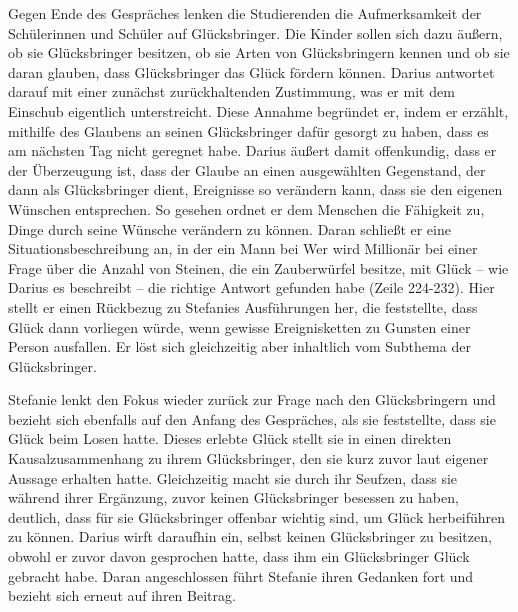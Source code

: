 Gegen Ende des Gespräches lenken die Studierenden die Aufmerksamkeit der Schülerinnen und Schüler auf Glücksbringer. 
Die Kinder sollen sich dazu äußern, ob sie Glücksbringer besitzen, ob sie Arten von Glücksbringern kennen und ob sie daran glauben, dass Glücksbringer das Glück fördern können. 
Darius antwortet darauf mit einer zunächst zurückhaltenden Zustimmung, was er mit dem Einschub \glqq eigentlich\grqq{} unterstreicht. 
Diese Annahme begründet er, indem er erzählt, mithilfe des Glaubens an seinen Glücksbringer dafür gesorgt zu haben, dass es am nächsten Tag nicht geregnet habe. 
Darius äußert damit offenkundig, dass er der Überzeugung ist, dass der Glaube an einen ausgewählten Gegenstand, der dann als Glücksbringer dient, Ereignisse so verändern kann, dass sie den eigenen Wünschen entsprechen. 
So gesehen ordnet er dem Menschen die Fähigkeit zu, Dinge durch seine Wünsche verändern zu können. 
Daran schließt er eine Situationsbeschreibung an, in der ein Mann bei \glqq Wer wird Millionär\grqq{} bei einer Frage über die Anzahl von Steinen, die ein Zauberwürfel besitze, mit Glück -- wie Darius es beschreibt -- die richtige Antwort gefunden habe (Zeile 224-232). 
Hier stellt er einen Rückbezug zu Stefanies Ausführungen her, die feststellte, dass Glück dann vorliegen würde, wenn gewisse Ereignisketten zu Gunsten einer Person ausfallen. 
Er löst sich gleichzeitig aber inhaltlich vom Subthema der Glücksbringer.

Stefanie lenkt den Fokus wieder zurück zur Frage nach den Glücksbringern und bezieht sich ebenfalls auf den Anfang des Gespräches, als sie feststellte, dass sie Glück beim Losen hatte. 
Dieses erlebte Glück stellt sie in einen direkten Kausalzusammenhang zu ihrem Glücksbringer, den sie kurz zuvor laut eigener Aussage erhalten hatte. 
Gleichzeitig macht sie durch ihr Seufzen, dass sie während ihrer Ergänzung, zuvor keinen Glücksbringer besessen zu haben, deutlich, dass für sie Glücksbringer offenbar wichtig sind, um Glück herbeiführen zu können. 
Darius wirft daraufhin ein, selbst keinen Glücksbringer zu besitzen, obwohl er zuvor davon gesprochen hatte, dass ihm ein Glücksbringer Glück gebracht habe. 
Daran angeschlossen führt Stefanie ihren Gedanken fort und bezieht sich erneut auf ihren Beitrag.

